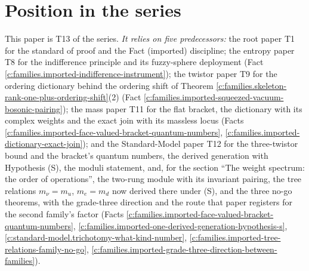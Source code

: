 \documentclass[11pt]{article}
\theoremstyle{definition}
\theoremstyle{plain}
\begin{document}
\section{Position in the series}

\label{c:note.families.setting-position-series}
This paper is T13 of the series. \emph{It relies on five predecessors:} the root paper T1 \cite{ButlerT1} for the standard of proof and the Fact (imported) discipline; the entropy paper T8 \cite{ButlerT8} for the indifference principle and its fuzzy-sphere deployment (Fact \ref{c:families.imported-indifference-instrument}); the twistor paper T9 \cite{ButlerT9} for the ordering dictionary behind the ordering shift of Theorem \ref{c:families.skeleton-rank-one-plus-ordering-shift}(2) (Fact \ref{c:families.imported-squeezed-vacuum-bosonic-pairing}); the mass paper T11 \cite{ButlerT11} for the flat bracket, the dictionary with its complex weights and the exact join with its massless locus (Facts \ref{c:families.imported-face-valued-bracket-quantum-numbers}, \ref{c:families.imported-dictionary-exact-join}); and the Standard-Model paper T12 \cite{ButlerT12} for the three-twistor bound and the bracket's quantum numbers, the derived generation with Hypothesis (S), the moduli statement, and, for the section ``The weight spectrum: the order of operations'', the two-rung module with its invariant pairing, the tree relations $m_{\nu} = m_{u}$, $m_{e} = m_{d}$ now derived there under (S), and the three no-go theorems, with the grade-three direction and the route that paper registers for the second family's factor (Facts \ref{c:families.imported-face-valued-bracket-quantum-numbers}, \ref{c:families.imported-one-derived-generation-hypothesis-s}, \ref{c:standard-model.trichotomy-what-kind-number}, \ref{c:families.imported-tree-relations-family-no-go}, \ref{c:families.imported-grade-three-direction-between-families}).
\end{document}

